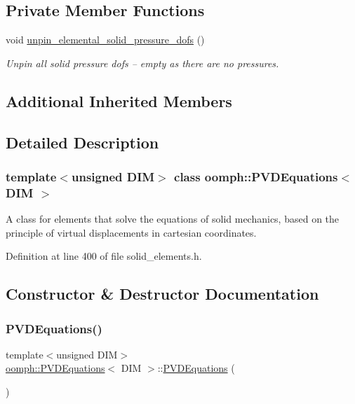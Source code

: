 \subsection*{Private Member Functions}
\begin{DoxyCompactItemize}
\item 
void \hyperlink{classoomph_1_1PVDEquations_a3ed682fe4a6e0919cc6e0d9445174463}{unpin\+\_\+elemental\+\_\+solid\+\_\+pressure\+\_\+dofs} ()
\begin{DoxyCompactList}\small\item\em Unpin all solid pressure dofs -- empty as there are no pressures. \end{DoxyCompactList}\end{DoxyCompactItemize}
\subsection*{Additional Inherited Members}


\subsection{Detailed Description}
\subsubsection*{template$<$unsigned D\+IM$>$\newline
class oomph\+::\+P\+V\+D\+Equations$<$ D\+I\+M $>$}

A class for elements that solve the equations of solid mechanics, based on the principle of virtual displacements in cartesian coordinates. 

Definition at line 400 of file solid\+\_\+elements.\+h.



\subsection{Constructor \& Destructor Documentation}
\mbox{\label{classoomph_1_1PVDEquations_a887fd03c27e4d7847b5eddeb66b0366d}} 
\subsubsection{\texorpdfstring{P\+V\+D\+Equations()}{PVDEquations()}}
{\footnotesize\ttfamily template$<$unsigned D\+IM$>$ \\
\hyperlink{classoomph_1_1PVDEquations}{oomph\+::\+P\+V\+D\+Equations}$<$ D\+IM $>$\+::\hyperlink{classoomph_1_1PVDEquations}{P\+V\+D\+Equations} (\begin{DoxyParamCaption}{ }\end{DoxyParamCaption})\hspace{0.3cm}{\ttfamily [inline]}}



